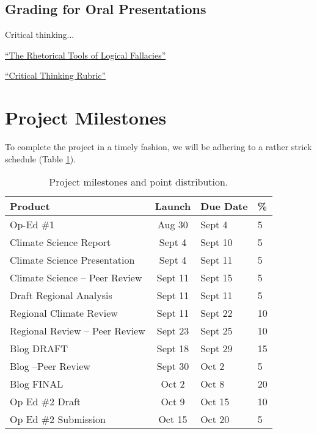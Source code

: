 \documentclass{article}\usepackage[]{graphicx}\usepackage[]{color}
\newenvironment{itemize*}%
  {\begin{itemize}%
    \setlength{\itemsep}{0pt}%
    \setlength{\parskip}{0pt}}%
  {\end{itemize}}
\begin{document}
\subsection{Grading for Oral Presentations}


Critical thinking...

\begin{itemize*}
  \item \href{https://github.com/marclos/Climate_Change_Narratives/raw/master/Writing_Resources/Logical_Fallacies.pdf}{``The Rhetorical Tools of Logical Fallacies''}
  \item \href{https://github.com/marclos/Climate_Change_Narratives/raw/master/Writing_Resources/Critical_Thinking.pdf}{``Critical Thinking Rubric''}
\end{itemize*}


\section{Project Milestones}

To complete the project in a timely fashion, we will be adhering to a rather strick schedule (Table \ref{tab:milestones}).

\begin{table}[h]

\caption{Project milestones and point distribution.}\label{tab:milestones}
\begin{tabular}{lcll}\hline
Product                     & Launch    & Due Date  & \% \\\hline\hline
Op-Ed \#1                   & Aug 30    & Sept 4    & 5 \\
Climate Science Report      & Sept 4    & Sept 10   & 5 \\
Climate Science Presentation& Sept 4    & Sept 11   & 5 \\
Climate Science -- Peer Review  & Sept 11 & Sept 15 & 5 \\
Draft Regional Analysis     & Sept 11   & Sept 11   & 5 \\
Regional Climate Review     & Sept 11   & Sept 22   & 10 \\
Regional Review -- Peer Review & Sept 23   & Sept 25 & 10 \\
Blog DRAFT                  & Sept 18   & Sept 29    & 15 \\
Blog --Peer Review          & Sept 30   & Oct 2     & 5\\
Blog FINAL                  & Oct 2     & Oct 8    & 20 \\
Op Ed \#2 Draft             & Oct 9     & Oct 15    & 10 \\
Op Ed \#2 Submission        & Oct 15    & Oct 20    & 5 \\ \hline
\end{tabular}
\end{table}
\end{document}

